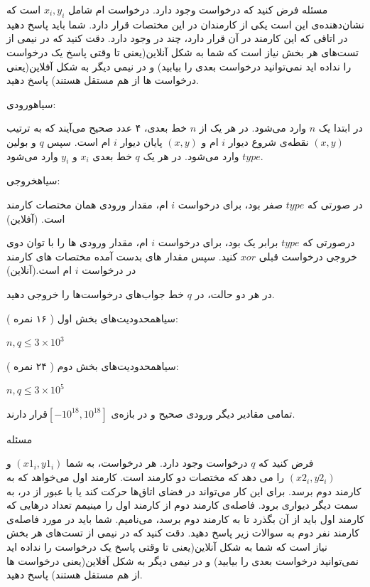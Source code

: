 
‌مسئله 
فرض کنید که
 درخواست وجود دارد. درخواست
ام شامل 
${x_i, y_i}$
است که نشان‌دهنده‌ی این است یکی از کارمندان در این مختصات قرار دارد. شما باید پاسخ دهید در اتاقی که این کارمند در آن قرار دارد، چند در وجود دارد. 
دقت کنید که در نیمی از تست‌های هر بخش نیاز است که شما به شکل آنلاین(یعنی تا وقتی پاسخ یک درخواست را نداده اید نمی‌توانید درخواست بعدی را بیابید) و در نیمی دیگر به شکل آفلاین(یعنی درخواست ها از هم مستقل هستند) پاسخ دهید.

‌سیاه{ورودی:}

در ابتدا یک
${n}$
 وارد می‌شود. در هر یک از
 ${n}$ 
خط بعدی، ۴ عدد صحیح می‌آیند که به ترتیب
 ${( x,y )}$
 نقطه‌ی شروع دیوار
 ${i}$
ام  و
 ${( x,y )}$
 پایان دیوار
 ${i}$
ام است. 
سپس 
${q}$ 
و بولین 
${type}$
 وارد می‌شود.  در هر یک
 ${q}$
 خط بعدی 
${x_i}$ 
و
 ${y_i}$
 وارد می‌شود.

‌سیاه{خروجی:}

در صورتی که ${type}$ صفر بود، برای درخواست ${i}$ ام، مقدار ورودی همان مختصات کارمند است. (آفلاین)

درصورتی که ${type}$ برابر یک بود، برای درخواست ${i}$ ام، مقدار ورودی ها را با توان دوی خروجی درخواست قبلی ${xor}$ کنید. سپس مقدار های بدست آمده مختصات های کارمند در درخواست ${i}$ ام است.(آنلاین)

در هر دو حالت، در ${q}$ خط جواب‌های درخواست‌ها را خروجی دهید.

‌سیاه{محدودیت‌های بخش اول ( ۱۶ نمره ): }

\begin{center}
    ${n,q \leq 3 \times 10^3 }$
\end{center}

‌سیاه{محدودیت‌های بخش دوم ( ۲۴ نمره ): }


\begin{center}
    ${n,q \leq 3 \times 10^5 }$
\end{center}

تمامی مقادیر دیگر ورودی صحیح و در بازه‌ی $ [ -10 ^ {18} , 10 ^ {18} ] $قرار دارند.

\newpage


‌مسئله 

فرض کنید که ${q}$ درخواست وجود دارد. هر درخواست، به شما ${(x1_i , y1_i)}$ و ${(x2_i, y2_i)}$ را می دهد که مختصات دو کارمند است. کارمند اول می‌خواهد که به کارمند دوم برسد. برای این کار می‌تواند در فضای اتاق‌ها حرکت کند یا با عبور از در، به سمت دیگر دیواری برود. فاصله‌ی کارمند دوم از کارمند اول را مینیمم تعداد درهایی که کارمند اول باید از آن بگذرد تا به کارمند دوم برسد، می‌نامیم. شما باید در مورد فاصله‌ی کارمند نفر دوم به سوالات زیر پاسخ دهید.
دقت کنید که در نیمی از تست‌های هر بخش نیاز است که شما به شکل آنلاین(یعنی تا وقتی پاسخ یک درخواست را نداده اید نمی‌توانید درخواست بعدی را بیابید) و در نیمی دیگر به شکل آفلاین(یعنی درخواست ها از هم مستقل هستند) پاسخ دهید.

